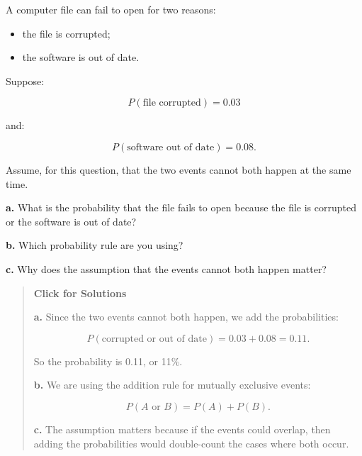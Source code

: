 \documentclass[
  letterpaper,
  DIV=11,
  numbers=noendperiod]{scrreprt}
\providecommand{\tightlist}{%
  \setlength{\itemsep}{0pt}\setlength{\parskip}{0pt}}
\begin{document}
\begin{tcolorbox}[enhanced jigsaw, arc=.35mm, bottomrule=.15mm, bottomtitle=1mm, breakable, colback=white, colbacktitle=quarto-callout-note-color!10!white, colframe=quarto-callout-note-color-frame, coltitle=black, left=2mm, leftrule=.75mm, opacityback=0, opacitybacktitle=0.6, rightrule=.15mm, title=\textcolor{quarto-callout-note-color}{\faInfo}\hspace{0.5em}{Question 7}, titlerule=0mm, toprule=.15mm, toptitle=1mm]

A computer file can fail to open for two reasons:

\begin{itemize}
\tightlist
\item
  the file is corrupted;
\item
  the software is out of date.
\end{itemize}

Suppose:

\[P(\text{file corrupted}) = 0.03\]

and:

\[P(\text{software out of date}) = 0.08.\]

Assume, for this question, that the two events cannot both happen at the
same time.

\textbf{a.} What is the probability that the file fails to open because
the file is corrupted or the software is out of date?

\textbf{b.} Which probability rule are you using?

\textbf{c.} Why does the assumption that the events cannot both happen
matter?

\begin{quote}
\textbf{Click for Solutions}

\textbf{a.} Since the two events cannot both happen, we add the
probabilities:

\[P(\text{corrupted or out of date}) = 0.03 + 0.08 = 0.11.\]

So the probability is 0.11, or 11\%.

\textbf{b.} We are using the addition rule for mutually exclusive
events:

\[P(A \text{ or } B) = P(A) + P(B).\]

\textbf{c.} The assumption matters because if the events could overlap,
then adding the probabilities would double-count the cases where both
occur.
\end{quote}

\end{tcolorbox}
\end{document}
